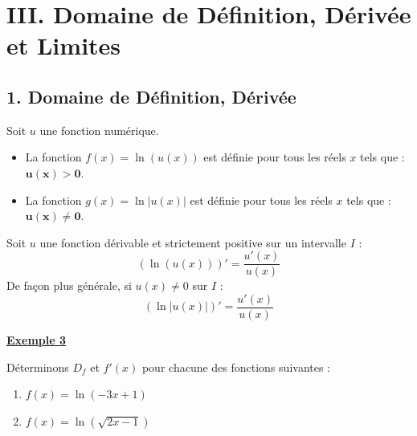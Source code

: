 \documentclass[12pt,a4paper]{article}
\begin{document}

\section*{\color{myred}III. Domaine de Définition, Dérivée et Limites }


\subsection*{\color{myred}1. Domaine de Définition, Dérivée }

\begin{tcolorbox}[colback=gray!5!white,colframe=black,title=\textbf{Règle pour le domaine de définition}]
Soit $u$ une fonction numérique.
\begin{itemize}
    \item La fonction $f(x) = \ln(u(x))$ est définie pour tous les réels $x$ tels que : $\mathbf{u(x) > 0}$.
    \item La fonction $g(x) = \ln|u(x)|$ est définie pour tous les réels $x$ tels que : $\mathbf{u(x) \neq 0}$.
\end{itemize}
\end{tcolorbox}

\begin{tcolorbox}[colback=blue!5!white,colframe=myblue,title=\textbf{Formules de dérivation}]
Soit $u$ une fonction dérivable et strictement positive sur un intervalle $I$ :
\[
(\ln(u(x)))' = \dfrac{u'(x)}{u(x)}
\]
De façon plus générale, si $u(x) \neq 0$ sur $I$ :
\[
(\ln|u(x)|)' = \dfrac{u'(x)}{u(x)}
\]
\end{tcolorbox}

\underline{\textbf{Exemple 3}}

\vspace{0.3cm}

Déterminons $D_f$ et $f'(x)$ pour chacune des fonctions suivantes :

\begin{enumerate}
    \item $f(x) = \ln(-3x + 1)$
    
    \dotfill
    
    \dotfill
    
    \dotfill
    
    \item $f(x) = \ln(\sqrt{2x - 1})$
    
    \dotfill
    
    \dotfill
\end{enumerate}
\end{document}
